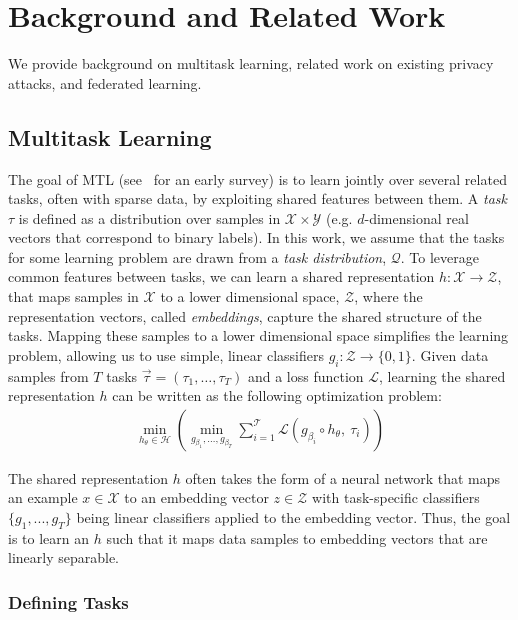 \section{Background and Related Work}

We provide background on multitask learning, related work on existing privacy attacks, and federated learning.

\subsection{Multitask Learning}

The goal of MTL (see~\cite{caruana-1997-multitask} for an early survey) is to learn jointly over several related tasks, often with sparse data, by exploiting shared features between them. A \textit{task} $\tau$ is defined as a distribution over samples in $\mathcal{X} \times \mathcal{Y}$ (e.g. $d$-dimensional real vectors that correspond to binary labels). In this work, we assume that the tasks for some learning problem are drawn from a \textit{task distribution}, $\mathcal{Q}$. To leverage common features between tasks, we can learn a shared representation $h : \mathcal{X} \to \mathcal{Z}$, that maps samples in $\mathcal{X}$ to a lower dimensional space, $\mathcal{Z}$, where the representation vectors, called \emph{embeddings}, capture the shared structure of the tasks. Mapping these samples to a lower dimensional space simplifies the learning problem, allowing us to use simple, linear classifiers $g_i: \mathcal{Z} \to \{0,1\}$. Given data samples from $T$ tasks $\vec{\tau} = (\tau_1,  \dots,  \tau_T)$ and a loss function $\mathcal{L}$, learning the shared representation $h$ can be written as the following optimization problem:
\begin{align*}
     \min_{{h_\theta \in \mathcal{H}}} 
     \left( 
     \min_{g_{\beta_1},\dots,g_{\beta_{T}}} \sum_{i=1}^{\mathcal{T}} \mathcal{L}(g_{\beta_{i}} \circ h_{\theta}, \: \tau_i) 
     \right)
\end{align*}

The shared representation $h$ often takes the form of a neural network that maps an example $x \in \mathcal{X}$ to an embedding vector $z \in \mathcal{Z}$ with task-specific classifiers $\{g_1, ..., g_{T}\}$ being linear classifiers applied to the embedding vector.  Thus, the goal is to learn an $h$ such that it maps data samples to embedding vectors that are linearly separable. 

\subsubsection{Defining Tasks}

